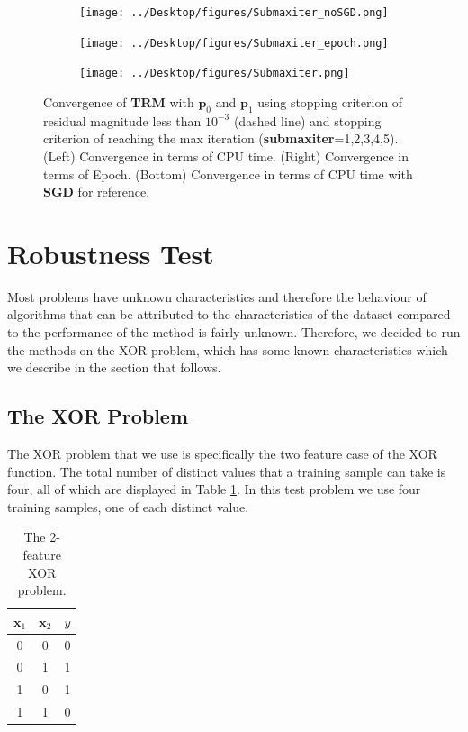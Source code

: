 \documentclass[letterpaper,12pt,titlepage,oneside,final]{book}
\begin{document}
	
	\begin{figure}
		\centering
		\begin{subfigure}{.49\textwidth}
			\texttt{[image: ../Desktop/figures/Submaxiter\_noSGD.png]}
		\end{subfigure}
		\begin{subfigure}{.49\textwidth}
			\texttt{[image: ../Desktop/figures/Submaxiter\_epoch.png]}
		\end{subfigure}
		\begin{subfigure}{.5\textwidth}
			\texttt{[image: ../Desktop/figures/Submaxiter.png]}
		\end{subfigure}
		\caption{Convergence of \textbf{TRM} with $\mathbf{p}_{0}$ and $\mathbf{p}_{1}$ using stopping criterion of residual magnitude less than $10^{-3}$ (dashed line) and stopping criterion of reaching the max iteration (\textbf{submaxiter}=1,2,3,4,5). (Left) Convergence in terms of CPU time. (Right) Convergence in terms of Epoch. (Bottom) Convergence in terms of CPU time with \textbf{SGD} for reference.}
		\label{figure:mnist_maxiter}
	\end{figure}
	
	\section{Robustness Test}
	
	Most problems have unknown characteristics and therefore the behaviour of algorithms that can be attributed to the characteristics of the dataset compared to the performance of the method is fairly unknown. Therefore, we decided to run the methods on the XOR problem, which has some known characteristics which we describe in the section that follows. 
	
	\subsection{The XOR Problem}
	
	The XOR problem that we use is specifically the two feature case of the XOR function. The total number of distinct values that a training sample can take is four, all of which are displayed in Table \ref{table:XOR}. In this test problem we use four training samples, one of each distinct value.
	
	\begin{table}[h] 
		\centering 
		\begin{tabular}{ |c|c||c| } 
			\hline 
			$\mathbf{x}_{1}$ & $\mathbf{x}_{2}$ & $y$\\ 
			\hline
			\hline
			0 & 0 & 0\\ 
			\hline 
			0 & 1 & 1\\ 
			\hline 
			1 & 0 & 1\\ 
			\hline 
			1 & 1 & 0\\ 
			\hline 
		\end{tabular} 
		\caption{The 2-feature XOR problem.} \label{table:XOR} \end{table}
	
\end{document}
